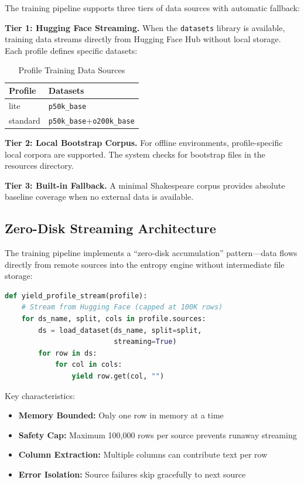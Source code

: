 \documentclass[11pt,a4paper,twocolumn]{article}
\begin{document}
The training pipeline supports three tiers of data sources with automatic fallback:

\textbf{Tier 1: Hugging Face Streaming.} When the \texttt{datasets} library is available, training data streams directly from Hugging Face Hub without local storage. Each profile defines specific datasets:

\begin{table}[H]
\centering
\caption{Profile Training Data Sources}
\small
\begin{tabular}{@{}lp{4cm}@{}}
\toprule
\textbf{Profile} & \textbf{Datasets} \\
\midrule
lite & \texttt{p50k\_base} \\
standard & \texttt{p50k\_base}+\texttt{o200k\_base} \\
\bottomrule
\end{tabular}
\label{tab:training_sources}
\end{table}

\textbf{Tier 2: Local Bootstrap Corpus.} For offline environments, profile-specific local corpora are supported. The system checks for bootstrap files in the resources directory.

\textbf{Tier 3: Built-in Fallback.} A minimal Shakespeare corpus provides absolute baseline coverage when no external data is available.

\subsection{Zero-Disk Streaming Architecture}

The training pipeline implements a ``zero-disk accumulation'' pattern---data flows directly from remote sources into the entropy engine without intermediate file storage:

\begin{lstlisting}[language=Python,caption=Streaming Data Flow]
def yield_profile_stream(profile):
    # Stream from Hugging Face (capped at 100K rows)
    for ds_name, split, cols in profile.sources:
        ds = load_dataset(ds_name, split=split, 
                          streaming=True)
        for row in ds:
            for col in cols:
                yield row.get(col, "")
\end{lstlisting}

Key characteristics:
\begin{itemize}
    \item \textbf{Memory Bounded:} Only one row in memory at a time
    \item \textbf{Safety Cap:} Maximum 100,000 rows per source prevents runaway streaming
    \item \textbf{Column Extraction:} Multiple columns can contribute text per row
    \item \textbf{Error Isolation:} Source failures skip gracefully to next source
\end{itemize}
\end{document}

